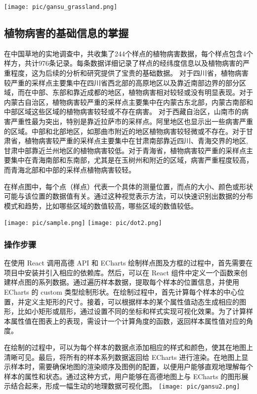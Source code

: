 \documentclass{article}
\begin{document}
\texttt{[image: pic/gansu\_grassland.png]} %
\subsection{植物病害的基础信息的掌握}
在中国草地的实地调查中，共收集了244个样点的植物病害数据，每个样点包含4个样方，共计976条记录。每条数据详细记录了样点的经纬度信息以及植物病害的严重程度，这为后续的分析和研究提供了宝贵的基础数据。
对于四川省，植物病害较严重的采样点主要集中在四川省西北部的高原地区以及靠近南部边界的部分区域，而在中部、东部和靠近成都的地区，植物病害相对较轻或没有明显表现。对于内蒙古自治区，植物病害较严重的采样点主要集中在内蒙古东北部，内蒙古南部和中部区域这些区域的植物病害较轻或不存在病害。
对于西藏自治区，山南市的病害严重性最为突出，特别是靠近拉萨市的采样点。阿里地区也显示出一些病害严重的区域。中部和北部地区，如那曲市附近的地区植物病害较轻微或不存在。对于甘肃省，植物病害较严重的采样点主要集中在甘肃南部靠近四川、青海交界的地区,甘肃中部靠近兰州地区的植物病害较低。对于青海省，植物病害较严重的采样点主要集中在青海南部和东南部，尤其是在玉树州和附近的区域，病害严重程度较高，而青海北部和中部的采样点植物病害较轻。

在样点图中，每个点（样点）代表一个具体的测量位置，而点的大小、颜色或形状可能与该位置的数据值有关。通过这种视觉表示方法，可以快速识别出数据的分布模式和趋势，比如哪些区域的数值较高，哪些区域的数值较低。
\par
\texttt{[image: pic/sample.png]} %
\texttt{[image: pic/dot2.png]} %
\subsubsection{操作步骤}

在使用 React 调用高德 API 和 ECharts 绘制样点图及方框的过程中，首先需要在项目中安装并引入相应的依赖库。然后，可以在 React 组件中定义一个函数来创建样点图的系列数据。通过遍历样本数据，提取每个样本的位置信息，并使用 ECharts 的 custom 类型绘制形状。在绘制过程中，首先计算每个样本的中心位置，并定义主矩形的尺寸。接着，可以根据样本的某个属性值动态生成相应的图形，比如小矩形或扇形，通过设置不同的坐标和样式实现可视化效果。为了计算样本属性值在图表上的表现，需设计一个计算角度的函数，返回样本属性值对应的角度。

在绘制的过程中，可以为每个样本的数据点添加相应的样式和颜色，使其在地图上清晰可见。最后，将所有的样本系列数据返回给 ECharts 进行渲染。在地图上显示样本时，需要确保地图的渲染顺序及图例的配置，以便用户能够直观地理解每个样本的属性和状态。通过这种方式，用户能够在高德地图上与 ECharts 的图形展示结合起来，形成一幅生动的地理数据可视化图。
\texttt{[image: pic/gansu2.png]} %
\end{document}
